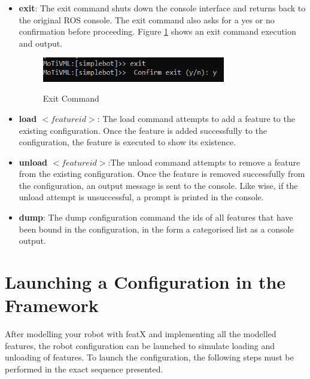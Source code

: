 \documentclass{article}
\begin{document}
\begin{itemize}
	\item \textbf{exit}: The exit command shuts down the console interface and returns back to the original ROS console. The exit command also asks for a yes or no confirmation before proceeding. Figure \ref{exit} shows an exit command execution and output.
	\begin{figure}[H]
		\caption{Exit Command}
		\centering
		\includegraphics[width=8cm]{images/exit.png}
		\label{exit}
	\end{figure}

	\item \textbf{load $<feature id>$}: The load command attempts to add a feature to the existing configuration. Once the feature is added successfully to the configuration, the feature is executed to show its existence.
	
	\item \textbf{unload $<feature id>$}:The unload command attempts to remove a feature from the existing configuration. Once the feature is removed successfully from the configuration, an output message is sent to the console. Like wise, if the unload attempt is unsuccessful, a prompt is printed in the console. 
	
	\item \textbf{dump}: The dump configuration command the ids of all features that have been bound in the configuration, in the form a categorised list as a console output.
\end{itemize}

\section{Launching a Configuration in the Framework}
After modelling your robot with featX and implementing all the modelled features, the robot configuration can be launched to simulate loading and unloading of features. To launch the configuration, the following steps must be performed in the exact sequence presented. 
\end{document}
